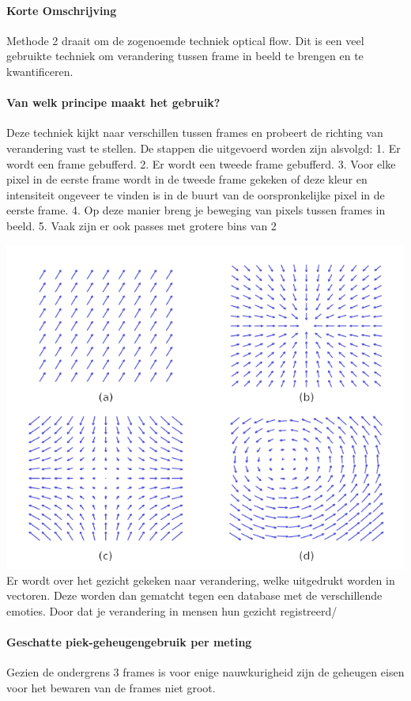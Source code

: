 \documentclass[11pt]{article}
\begin{document}
    \paragraph{Korte Omschrijving}
    Methode 2 draait om de zogenoemde techniek optical flow.
    Dit is een veel gebruikte techniek om verandering tussen frame in beeld te brengen en te kwantificeren.

    \paragraph{Van welk principe maakt het gebruik?}
    Deze techniek kijkt naar verschillen tussen frames en probeert de richting van verandering vast te stellen.
    De stappen die uitgevoerd worden zijn alsvolgd:
    1. Er wordt een frame gebufferd.
    2. Er wordt een tweede frame gebufferd.
    3. Voor elke pixel in de eerste frame wordt in de tweede frame gekeken of deze kleur en intensiteit ongeveer te vinden is in de buurt van de oorspronkelijke pixel in de eerste frame.
    4. Op deze manier breng je beweging van pixels tussen frames in beeld.
    5. Vaak zijn er ook passes met grotere bins van 2

    \includegraphics[height=0.2\textheight]{Images/Vector-field-examples.jpg}
    Er wordt over het gezicht gekeken naar verandering, welke uitgedrukt worden in vectoren.
    Deze worden dan gematcht tegen een database met de verschillende emoties.
    Door dat je verandering in mensen hun gezicht registreerd/

    \paragraph{Geschatte piek-geheugengebruik per meting}
    Gezien de ondergrens 3 frames is voor enige nauwkurigheid zijn de geheugen eisen voor het bewaren van de frames niet groot.
\end{document}
